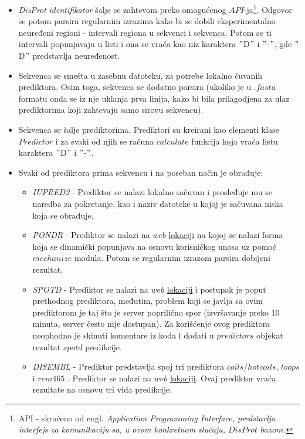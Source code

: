 \begin{itemize}
\item  \textit{DisProt}  \textit{identifikator} šalje se zahtevom preko omogućenog $API$-ja\footnote{API - skraćeno od engl. \em{Application Programming Interface}, predstavlja interfejs za komunikaciju sa, u ovom konkretnom slučaju, $DisProt$ $bazom$. }. Odgovor se potom parsira regularnim izrazima kako bi se dobili eksperimentalno neuređeni regioni - intervali regiona u sekvenci i sekvenca. Potom se ti intervali popunjavaju u listi i ona se vraća kao niz karaktera $"$D$"$ i $"$-$"$, gde $"$D$"$ predstavlja neuređenost.
\item Sekvenca se smešta u zasebnu datoteku, za potrebe lokalno čuvanih prediktora. Osim toga, sekvenca se dodatno parsira (ukoliko je u $.fasta$ formatu onda se iz nje uklanja prva linija, kako bi bila prilagodjena za ulaz prediktorima koji zahtevaju samo sirovu sekvencu).
\item Sekvenca se šalje prediktorima. Prediktori su kreirani kao elementi klase $Predictor$ i za svaki od njih se računa $calculate$ funkcija koja vraća listu karaktera $"$D$"$ i $"$-$"$.
\item Svaki od prediktora prima sekvencu i na poseban način je obrađuje:
	\begin{itemize}
	\item \textit{IUPRED2} - Prediktor se nalazi lokalno sačuvan i prosleđuje mu se naredba za pokretanje, kao i naziv datoteke u kojoj je sačuvana niska koja se obrađuje.  
	\item \textit{PONDR} - Prediktor se nalazi na $web$  \href{http://www.pondr.com/cgi-bin/pondr.cgi}{lokaciji} na kojoj se nalazi forma koja se dinamički popunjava na osnovu korisničkog unosa uz pomoć $mechanize$ modula. Potom se regularnim izrazom parsira dobijeni rezultat.  
	\item \textit{SPOTD} - Prediktor se nalazi na $web$ \href{http://sparks-lab.org/server/SPOT-disorder/}{lokaciji} i postupak je poput prethodnog prediktora, međutim, problem koji se javlja sa ovim prediktorom je taj što je server poprilično spor (izvršavanje preko 10 minuta, server često nije dostupan). Za korišćenje ovog prediktora neophodno je skinuti komentare iz koda i dodati u $predictors$ objekat rezultat $spotd$ predikcije.
	\item \textit{DISEMBL} - Prediktor predstavlja spoj tri prediktora $coils/hotcoils$, $loops$ i $rem465$ . Prediktor se nalazi na $web$ \href{http://dis.embl.de/cgiDict.py}{lokaciji}. Ovaj prediktor vraća rezultate na osnovu tri vida predikcije. 
	\end{itemize}
\end{itemize}

